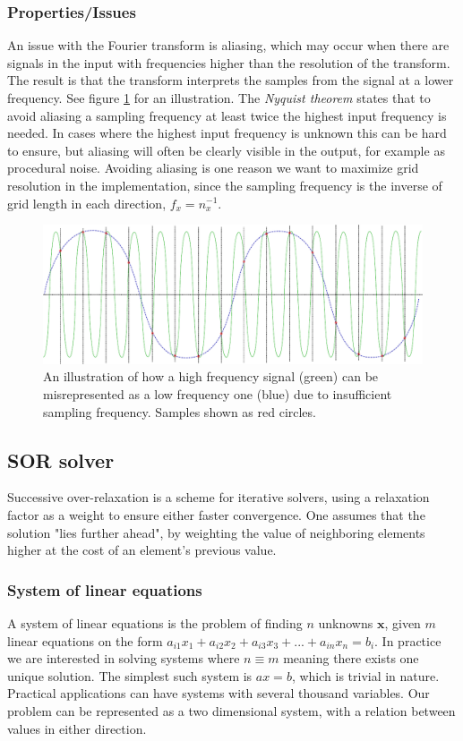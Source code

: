 \subsubsection*{Properties/Issues}
An issue with the Fourier transform is aliasing, which may occur when there are signals in the input with frequencies
higher than the resolution of the transform. The result is that the transform interprets the samples from the signal at
a lower frequency. See figure \ref{fig:aliasing} for an illustration. The \emph{Nyquist theorem} states that to avoid
aliasing a sampling frequency at least twice the highest input frequency is needed. In cases where the highest input
frequency is unknown this can be hard to ensure, but aliasing will often be clearly visible in the output, for example as
procedural noise. Avoiding aliasing is one reason we want to maximize grid resolution in the implementation, since the
sampling frequency is the inverse of grid length in each direction, $f_x = n_x^{-1}$.
\begin{figure}[!htbp]
	\centering
	\includegraphics[width=\textwidth]{figure/aliasing}
	\caption[Aliasing]{An illustration of how a high frequency signal (green) can be misrepresented as a low frequency one (blue) due to insufficient sampling frequency.
	Samples shown as red circles.}
	\label{fig:aliasing}
\end{figure}

\subsection{SOR solver}
Successive over-relaxation is a scheme for iterative solvers, using a relaxation factor as a weight to ensure either
faster convergence. One assumes that the solution "lies further ahead", by weighting the value of neighboring
elements higher at the cost of an element's previous value.

\subsubsection*{System of linear equations}
A system of linear equations is the problem of finding $n$ unknowns $\mathbf{x}$, given $m$ linear equations on the form
$ a_{i1}x_1 + a_{i2}x_2 + a_{i3}x_3 + ... + a_{in}x_n = b_i $. In practice we are interested in solving systems where
$n \equiv m$ meaning there exists one unique solution. The simplest such system is $ax=b$, which is trivial in nature.
Practical applications can have systems with several thousand variables. Our problem can be represented as a two
dimensional system, with a relation between values in either direction.

